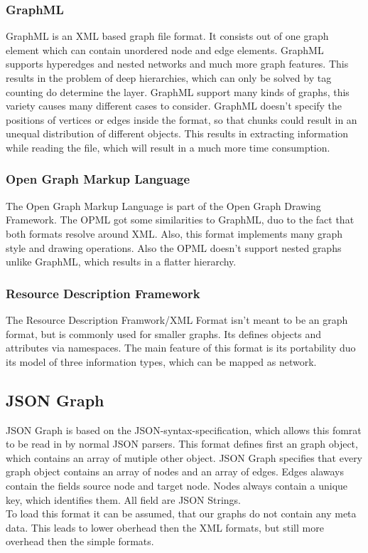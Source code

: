 \subsubsection{GraphML}
GraphML is an XML based graph file format. It consists out of one graph element which can contain unordered node and edge elements. GraphML supports hyperedges and nested networks and much more graph features. This results in the problem of deep hierarchies, which can only be solved by tag counting do determine the layer. GraphML support many kinds of graphs, this variety causes many different cases to consider. GraphML doesn't specify the positions of vertices or edges inside the format, so that chunks could result in an unequal distribution of different objects. This results in extracting information while reading the file, which will result in a much more time consumption.\cite{brandes2013graph,kuhner2013graphml}

\subsubsection{Open Graph Markup Language}
The Open Graph Markup Language is part of the Open Graph Drawing Framework. The OPML got some similarities to GraphML, duo to the fact that both formats resolve around XML. Also, this format implements many graph style and drawing operations. Also the OPML doesn’t support nested graphs unlike GraphML, which results in a flatter hierarchy.\cite{opengraph.format}

\subsubsection{Resource Description Framework}
The Resource Description Framwork/XML Format isn't meant to be an graph format, but is commonly used for smaller graphs. Its defines objects and attributes via namespaces. The main feature of this format is its portability duo its model of three information types, which can be mapped as network.\cite{miller1998introduction,Lassila98resourcedescription}

\subsection{JSON Graph}
JSON Graph is based on the JSON-syntax-specification, which allows this fomrat to be read in by normal JSON parsers. This format defines first an graph object, which contains an array of mutiple other object. JSON Graph specifies that every graph object contains an array of nodes and an array of edges. Edges alaways contain the fields source node and target node. Nodes always contain a unique key, which identifies them. All field are JSON Strings.\\
To load this format it can be assumed, that our graphs do not contain any meta data. This leads to lower oberhead then the XML formats, but still more overhead then the simple formats.\cite{json.format,Roughan.10.03.2015}

